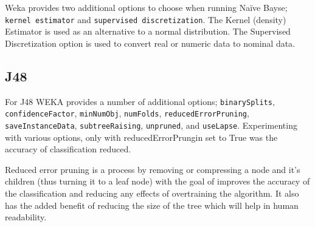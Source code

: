 \documentclass[10pt]{article}
\begin{document}
      Weka provides two additional options to choose when running Naïve Bayse; \texttt{kernel estimator} and \texttt{supervised discretization}. The Kernel (density) Estimator is used as an alternative to a normal distribution\cite{kernelEstimator}. The Supervised Discretization option is used to convert real or numeric data to nominal data\cite{discretizeFilter}. \\

    \subsection{J48}


      For J48 WEKA provides a number of additional options; \texttt{binarySplits}, \texttt{confidenceFactor}, \texttt{minNumObj}, \texttt{numFolds}, \texttt{reducedErrorPruning}, \texttt{saveInstanceData}, \texttt{subtreeRaising}, \texttt{unpruned}, and \texttt{useLapse}. Experimenting with various options, only with reducedErrorPrungin set to True was the accuracy of classification reduced. 

      Reduced error pruning is a process by removing or compressing a node and it's children (thus turning it to a leaf node) with the goal of improves the accuracy of the classification and reducing any effects of overtraining the algorithm. It also has the added benefit of reducing the size of the tree which will help in human readability.
\end{document}
